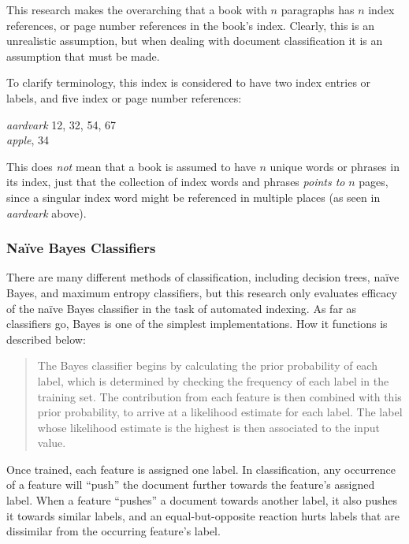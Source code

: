 This research makes the overarching that a book with $n$ paragraphs has $n$ index references, or page number references in the book's index.
Clearly, this is an unrealistic assumption, but when dealing with document classification it is an assumption that must be made.

To clarify terminology, this index is considered to have two index entries or labels, and five index or page number references:

\begin{center}
\textit{aardvark} 12, 32, 54, 67 \\
\textit{apple}, 34
\end{center}

\noindent This does {\it not} mean that a book is assumed to have $n$ unique words or phrases in its index, just that the collection of index words and phrases {\it points to} $n$ pages, since a singular index word might be referenced in multiple places (as seen in {\it aardvark} above).

\subsubsection{Na{\"i}ve Bayes Classifiers}

There are many different methods of classification, including decision trees, na{\"i}ve Bayes, and maximum entropy classifiers\cite{nlpwp}, but this research only evaluates efficacy of the na{\"i}ve Bayes classifier in the task of automated indexing.
As far as classifiers go, \naive Bayes is one of the simplest implementations\cite{rish}.
How it functions is described below:
\begin{quote}
The \naive Bayes classifier begins by calculating the prior probability of each label, which is determined by checking the frequency of each label in the training set. The contribution from each feature is then combined with this prior probability, to arrive at a likelihood estimate for each label. The label whose likelihood estimate is the highest is then associated to the input value.\cite{nlpwp}
\end{quote}
\noindent Once trained, each feature is assigned one label.
In classification, any occurrence of a feature will ``push'' the document further towards the feature's assigned label.
When a feature ``pushes'' a document towards another label, it also pushes it towards similar labels, and an equal-but-opposite reaction hurts labels that are dissimilar from the occurring feature's label.

